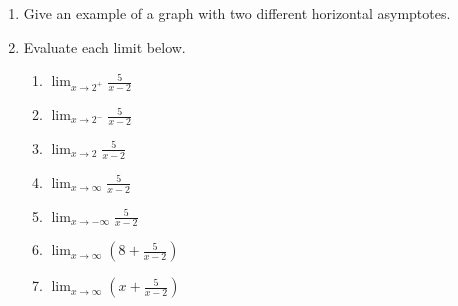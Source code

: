\documentclass[12pt]{article}
\begin{document}
\begin{enumerate}
\item Give an example of a graph with two different horizontal asymptotes.
\vfill
\item Evaluate each limit below. \\
\begin{multicols}{2}

	\begin{enumerate}
	\item $\displaystyle \lim_{x \to 2^+} \frac{5}{x-2}$\\ 
	
	\vfill
	\item $\displaystyle \lim_{x \to 2^-} \frac{5}{x-2}$\\ 
	
	\vfill
	\item $\displaystyle \lim_{x \to 2} \frac{5}{x-2}$\\ 
	
	\vfill
	
	\columnbreak
	
	\item $\displaystyle \lim_{x \to \infty} \frac{5}{x-2}$\\ 
	
	\vfill
	\item $\displaystyle \lim_{x \to -\infty} \frac{5}{x-2}$\\ 
	
	\vfill
	\item $\displaystyle \lim_{x \to \infty} \left(8+\frac{5}{x-2}\right)$\\ 
	
	\vfill
	\item $\displaystyle \lim_{x \to \infty} \left(x+\frac{5}{x-2}\right)$\\
	
	 \vfill
	\end{enumerate}
\end{multicols}	
\end{enumerate}
\end{document}
